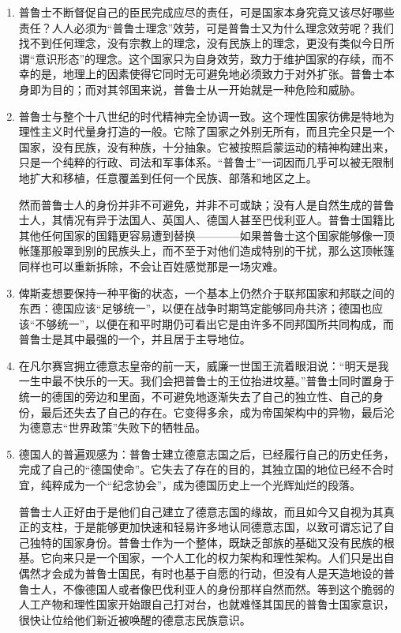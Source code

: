 \documentclass[UTF8]{ctexart}
\begin{document}
\begin{enumerate}
		\item 普鲁士不断督促自己的臣民完成应尽的责任，可是国家本身究竟又该尽好哪些责任？人人必须为“普鲁士理念”效劳，可是普鲁士又为什么理念效劳呢？我们找不到任何理念，没有宗教上的理念，没有民族上的理念，更没有类似今日所谓“意识形态”的理念。这个国家只为自身效劳，致力于维护国家的存续，而不幸的是，地理上的因素使得它同时无可避免地必须致力于对外扩张。普鲁士本身即为目的；而对其邻国来说，普鲁士从一开始就是一种危险和威胁。
		
		\item 普鲁士与整个十八世纪的时代精神完全协调一致。这个理性国家彷佛是特地为理性主义时代量身打造的一般。它除了国家之外别无所有，而且完全只是一个国家，没有民族，没有种族，十分抽象。它被按照启蒙运动的精神构建出来，只是一个纯粹的行政、司法和军事体系。“普鲁士”一词因而几乎可以被无限制地扩大和移植，任意覆盖到任何一个民族、部落和地区之上。
		
		然而普鲁士人的身份并非不可避免，并非不可或缺；没有人是自然生成的普鲁士人，其情况有异于法国人、英国人、德国人甚至巴伐利亚人。普鲁士国籍比其他任何国家的国籍更容易遭到替换————如果普鲁士这个国家能够像一顶帐篷那般罩到别的民族头上，而不至于对他们造成特别的干扰，那么这顶帐篷同样也可以重新拆除，不会让百姓感觉那是一场灾难。
		
		\item 俾斯麦想要保持一种平衡的状态，一个基本上仍然介于联邦国家和邦联之间的东西：德国应该“足够统一”，以便在战争时期笃定能够同舟共济；德国也应该“不够统一”，以便在和平时期仍可看出它是由许多不同邦国所共同构成，而普鲁士是其中最强的一个，并且居于主导地位。
		
		\item 在凡尔赛宫拥立德意志皇帝的前一天，威廉一世国王流着眼泪说：“明天是我一生中最不快乐的一天。我们会把普鲁士的王位抬进坟墓。”普鲁士同时置身于统一的德国的旁边和里面，不可避免地逐渐失去了自己的独立性、自己的身份，最后还失去了自己的存在。它变得多余，成为帝国架构中的异物，最后沦为德意志“世界政策”失败下的牺牲品。
		
		\item 德国人的普遍观感为：普鲁士建立德意志国之后，已经履行自己的历史任务，完成了自己的“德国使命”。它失去了存在的目的，其独立国的地位已经不合时宜，纯粹成为一个“纪念协会”，成为德国历史上一个光辉灿烂的段落。
		
		普鲁士人正好由于是他们自己建立了德意志国的缘故，而且如今又自视为其真正的支柱，于是能够更加快速和轻易许多地认同德意志国，以致可谓忘记了自己独特的国家身份。普鲁士作为一个整体，既缺乏部族的基础又没有民族的根基。它向来只是一个国家，一个人工化的权力架构和理性架构。人们只是出自偶然才会成为普鲁士国民，有时也基于自愿的行动，但没有人是天造地设的普鲁士人，不像德国人或者像巴伐利亚人的身份那样自然而然。等到这个脆弱的人工产物和理性国家开始跟自己打对台，也就难怪其国民的普鲁士国家意识，很快让位给他们新近被唤醒的德意志民族意识。
		\end{enumerate}
	
\end{document}
